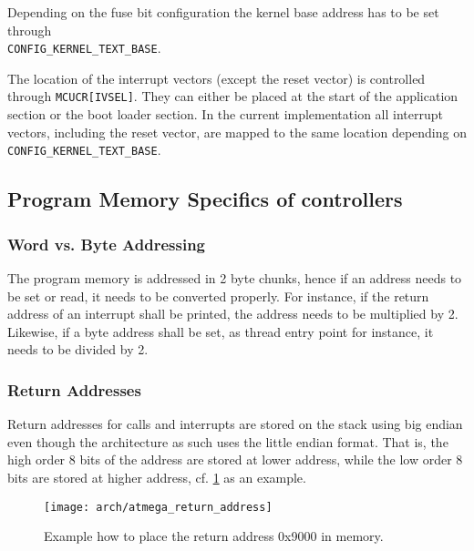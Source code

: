 		Depending on the fuse bit configuration the kernel base address has to be set through\\\lstinline{CONFIG_KERNEL_TEXT_BASE}. 

		The location of the interrupt vectors (except the reset vector) is controlled through \lstinline{MCUCR[IVSEL]}. They can either be placed at the start of the application section or the boot loader section. In the current implementation all interrupt vectors, including the reset vector, are mapped to the same location depending on \lstinline{CONFIG_KERNEL_TEXT_BASE}.

	\subsection{Program Memory Specifics of \atmega controllers}
		\subsubsection{Word vs. Byte Addressing}
			The \avr program memory is addressed in 2 byte chunks, hence if an address needs to be set or read, it needs to be converted properly. For instance, if the return address of an interrupt shall be printed, the address needs to be multiplied by 2. Likewise, if a byte address shall be set, as thread entry point for instance, it needs to be divided by 2.

		\subsubsection{Return Addresses}
			Return addresses for calls and interrupts are stored on the stack using big endian even though the \atmega architecture as such uses the little endian format. That is, the high order 8 bits of the address are stored at lower address, while the low order 8 bits are stored at higher address, cf. \ref{fig:atmega_return_address} as an example.
			\begin{figure}[h]
				\centering	
				\texttt{[image: arch/atmega\_return\_address]}
				\caption{Example how to place the return address 0x9000 in memory.}
				\label{fig:atmega_return_address}
			\end{figure}
